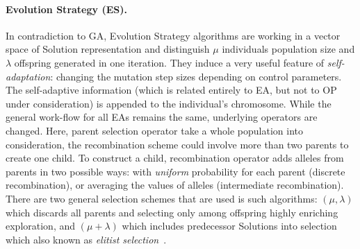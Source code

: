 \paragraph{Evolution Strategy (ES).} In contradiction to GA, Evolution Strategy algorithms are working in a vector space of Solution representation and distinguish $\mu$ individuals population size and $\lambda$ offspring generated in one iteration. They induce a very useful feature of \textit{self-adaptation}: changing the mutation step sizes depending on control parameters. The self-adaptive information (which is related entirely to EA, but not to OP under consideration) is appended to the individual's chromosome. While the general work-flow for all EAs remains the same, underlying operators are changed. Here, parent selection operator take a whole population into consideration, the recombination scheme could involve more than two parents to create one child. To construct a child, recombination operator adds alleles from parents in two possible ways: with \textit{uniform} probability for each parent (discrete recombination), or averaging the values of alleles (intermediate recombination). There are two general selection schemes that are used is such algorithms: $(\mu,\lambda)$ which discards all parents and selecting only among offspring highly enriching exploration, and $(\mu+\lambda)$ which includes predecessor Solutions into selection which also known as \textit{elitist selection}~\cite{eiben2015popular}.

